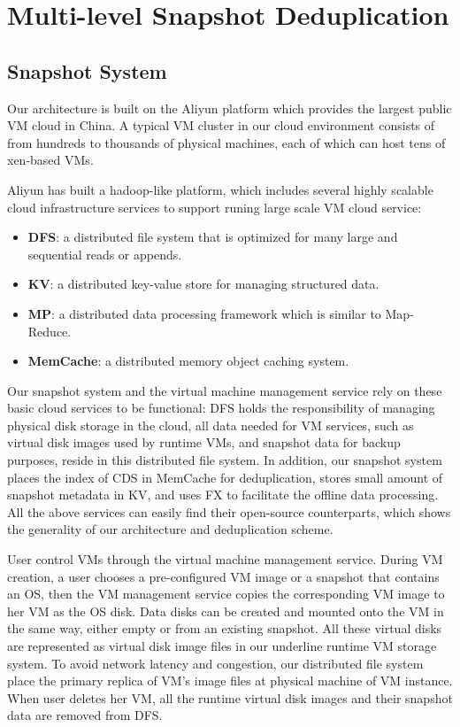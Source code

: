 \section{Multi-level Snapshot Deduplication}
\label{sect:dedupe}

\subsection{Snapshot System}
Our architecture is built on the Aliyun platform which provides the largest public VM cloud in China. 
A typical VM cluster in our cloud environment
consists of from hundreds to thousands of physical machines, each of which can
host tens of xen-based\cite{Barham2003} VMs.

Aliyun has built a hadoop-like platform, which includes
several highly scalable cloud infrastructure services to support
 runing large scale VM cloud service:
\begin{itemize}
\item \textbf{DFS}: a distributed file system that is optimized for many large and sequential reads or appends.
\item \textbf{KV}: a distributed key-value store for managing structured data.
\item \textbf{MP}: a distributed data processing framework which is similar to Map-Reduce\cite{Dean2004}.
\item \textbf{MemCache}: a distributed memory object caching system.
\end{itemize}
Our snapshot system and the virtual machine management service rely on these basic cloud services
to be functional:
DFS holds the responsibility of managing physical disk storage
in the cloud, all data needed for VM services, such as virtual disk images used by runtime VMs,
and snapshot data for backup purposes, reside in this distributed file system. 
In addition, our snapshot system 
places the index of CDS in MemCache for deduplication, 
stores small amount of snapshot metadata in KV, and uses FX to facilitate the offline
data processing. All the above services can easily find their open-source counterparts,
which shows the generality of our architecture and deduplication scheme.

User control VMs through the virtual machine management service.
During VM creation, a user chooses a pre-configured VM image or
a snapshot that contains an OS,
then the VM management service 
copies the corresponding VM image to her VM as the OS disk.
Data disks can be created and mounted onto the VM in the same way,
either empty or from an existing snapshot. 
All these virtual disks are represented as virtual disk image files in our
underline runtime VM storage system.  
To avoid network latency and congestion, 
our distributed file system place the primary replica of VM's 
image files at physical machine of VM instance.
When user deletes her VM, all the runtime virtual disk images and
their snapshot data are removed from DFS.


